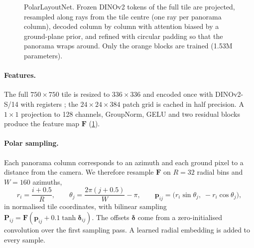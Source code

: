 \documentclass[11pt]{article}
\begin{document}
\begin{figure}[t]
  \caption{PolarLayoutNet. Frozen DINOv2 tokens of the full tile are projected, resampled along rays from the
  tile centre (one ray per panorama column), decoded column by column with attention biased by a ground-plane
  prior, and refined with circular padding so that the panorama wraps around. Only the orange blocks are
  trained (1.53M parameters).}
  \label{fig:polarnet}
\end{figure}

\paragraph{Features.} The full $750\times750$ tile is resized to $336\times336$ and encoded once with
DINOv2-S/14 with registers \cite{oquab2023dinov2,darcet2023registers}; the $24\times24\times384$ patch grid is
cached in half precision. A $1\times1$ projection to 128 channels, GroupNorm, GELU and two residual blocks
produce the feature map $\mathbf{F}$ (\cref{fig:polarnet}).

\paragraph{Polar sampling.} Each panorama column corresponds to an azimuth and each ground pixel to a distance
from the camera. We therefore resample $\mathbf{F}$ on $R=32$ radial bins and $W=160$ azimuths,
\begin{equation}
  r_i=\frac{i+0.5}{R},\qquad \theta_j=\frac{2\pi(j+0.5)}{W}-\pi,\qquad
  \mathbf{p}_{ij}=\big(r_i\sin\theta_j,\;-r_i\cos\theta_j\big),
  \label{eq:polar}
\end{equation}
in normalised tile coordinates, with bilinear sampling $\mathbf{P}_{ij}=\mathbf{F}(\mathbf{p}_{ij}+0.1\tanh
\boldsymbol{\delta}_{ij})$. The offsets $\boldsymbol{\delta}$ come from a zero-initialised convolution over
the first sampling pass. A learned radial embedding is added to every sample.
\end{document}
